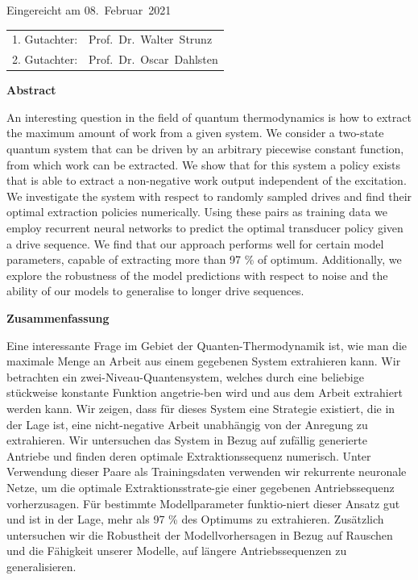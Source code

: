 \thispagestyle{empty}\vspace*{48em}

Eingereicht am 08.~Februar~2021\vspace{1.5em}
\par{\large\begin{tabular}{ll}
 1. Gutachter: & Prof.~Dr.~Walter~Strunz \\
 2. Gutachter: & Prof.~Dr.~Oscar~Dahlsten \\
\end{tabular}}


\newpage
\begin{center}\large\bfseries Abstract\end{center}
%
%
An interesting question in the field of quantum thermodynamics is how to extract the maximum amount of work from a given system.
We consider a two-state quantum system that can be driven by an arbitrary piecewise constant function, from which work can be extracted.
We show that for this system a policy exists that is able to extract a non-negative work output independent of the excitation.
We investigate the system with respect to randomly sampled drives and find their optimal extraction policies numerically.
Using these pairs as training data we employ recurrent neural networks to predict the optimal transducer policy given a drive sequence.
We find that our approach performs well for certain model parameters, capable of extracting more than 97 \% of optimum.
Additionally, we explore the robustness of the model predictions with respect to noise and the ability of our models to generalise to longer drive sequences.

\vspace{10em}
\begin{center}\large\bfseries Zusammenfassung\end{center}
Eine interessante Frage im Gebiet der Quanten-Thermodynamik ist, wie man die maximale Menge an Arbeit aus einem gegebenen System extrahieren kann.
Wir betrachten ein zwei-Niveau-Quantensystem, welches durch eine beliebige stückweise konstante Funktion angetrie-ben wird und aus dem Arbeit extrahiert werden kann.
Wir zeigen, dass für dieses System eine Strategie existiert, die in der Lage ist, eine nicht-negative Arbeit unabhängig von der Anregung zu extrahieren.
Wir untersuchen das System in Bezug auf zufällig generierte Antriebe und finden deren optimale Extraktionssequenz numerisch.
Unter Verwendung dieser Paare als Trainingsdaten verwenden wir rekurrente neuronale Netze, um die optimale Extraktionsstrate-gie einer gegebenen Antriebssequenz vorherzusagen.
Für bestimmte Modellparameter funktio-niert dieser Ansatz gut und ist in der Lage, mehr als 97 \% des Optimums zu extrahieren.
Zusätzlich untersuchen wir die Robustheit der Modellvorhersagen in Bezug auf Rauschen und die Fähigkeit unserer Modelle, auf längere Antriebssequenzen zu generalisieren.
 
